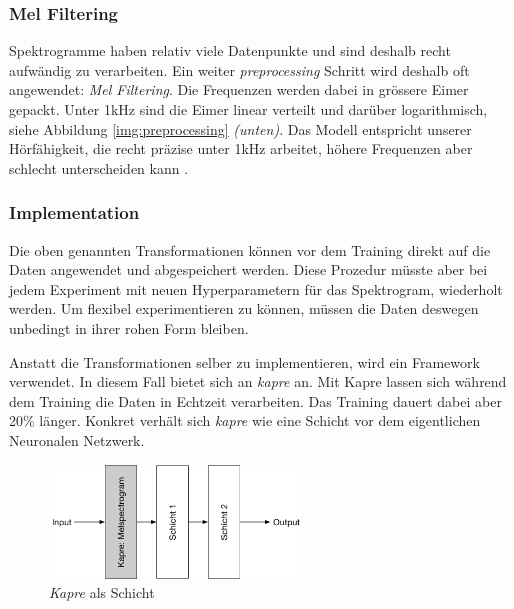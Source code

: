 \subsubsection{Mel Filtering} 

Spektrogramme haben relativ viele Datenpunkte und sind deshalb recht aufwändig zu verarbeiten. Ein weiter \textit{preprocessing} Schritt wird deshalb oft angewendet: \textit{Mel Filtering}\parencite{mel}. Die Frequenzen werden dabei in grössere Eimer gepackt. Unter 1kHz sind die Eimer linear verteilt und darüber logarithmisch, siehe Abbildung \ref{img:preprocessing} \textit{(unten)}. Das Modell entspricht unserer Hörfähigkeit, die recht präzise unter 1kHz arbeitet, höhere Frequenzen aber schlecht unterscheiden kann \parencite{tenkHz}. 

\subsubsection{Implementation}

Die oben genannten Transformationen können vor dem Training direkt auf die Daten angewendet und abgespeichert werden. Diese Prozedur müsste aber bei jedem Experiment mit neuen Hyperparametern für das Spektrogram, wiederholt werden. Um flexibel experimentieren zu können, müssen die Daten deswegen unbedingt in ihrer rohen Form bleiben. 

Anstatt die Transformationen selber zu implementieren, wird ein Framework verwendet. In diesem Fall bietet sich an \textit{kapre}\parencite{kapre} an. Mit Kapre lassen sich während dem Training die Daten in Echtzeit verarbeiten. Das Training dauert dabei aber 20\% länger. Konkret verhält sich \textit{kapre} wie eine Schicht vor dem eigentlichen Neuronalen Netzwerk.
\begin{figure}[hbt]
	\centering
		\includegraphics[width=0.6\textwidth]{assets/kapre.png}
	\centering
	\caption{\textit{Kapre}\parencite{kapre} als Schicht}
	\label{img:kapre}
\end{figure}

